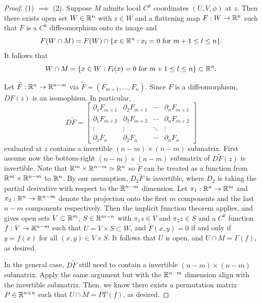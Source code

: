 \documentclass[a4paper]{article}
\begin{document}
\begin{proof}
(1) $\implies$ (2). Suppose $M$ admits local 
$C^k$ coordinates $(U, V, \phi)$ at $z$. Then there exists 
open set $W \in \mathbb{R}^n$ with $z \in W$ and a flattening map 
$F : W \to \mathbb{R}^n$ such that $F$ is a $C^k$ diffeomorphism 
onto its image and 
\[
F(W \cap M) = F(W) \cap \{x \in \mathbb{R}^n : \text{$x_l = 0$ 
for $m + 1 \leq l \leq n$}\}.
\]
It follows that 
\[
W \cap M = \{x \in W: \text{$F_l(x) = 0$ for 
$m + 1 \leq l \leq n$}\} \subset \mathbb{R}^n.
\]

Let $\widetilde{F} : \mathbb{R}^n \to \mathbb{R}^{n - m}$ 
via $\tilde{F} = (F_{m+1}, \dots, F_n)$.
Since $F$ is a diffeomorphism, $DF(z)$ is an isomophism. 
In particular,
\[
D \tilde{F} = 
\begin{bmatrix}
  \partial_1 F_{m+1} & \partial_2 F_{m+1} & \cdots & \partial_n F_{m+1} \\
  \partial_1 F_{m+2} & \partial_2 F_{m+2} & \cdots & \partial_n F_{m+2} \\
  \vdots & \vdots & \ddots & \vdots \\
  \partial_1 F_n & \partial_2 F_n & \cdots & \partial_n F_n
\end{bmatrix}
\]
evaluated at $z$ 
contains a invertible $(n - m) \times (n - m)$ submatrix.
First assume now the bottom-right $(n - m) \times (n - m)$ 
submatrix of $D \tilde{F} (z)$ is invertible. 
Note that $\mathbb{R}^m \times \mathbb{R}^{n - m} \simeq \mathbb{R}^n$ so $\tilde{F}$
can be treated as a function from $\mathbb{R}^m \times \mathbb{R}^{n - m}$
to $\mathbb{R}^n$. 
By our assumption, $D_2 \tilde{F}$ is invertible, where 
$D_2$ is taking the partial derivative with respect to the 
$\mathbb{R}^{n - m}$ dimension. Let $\pi_1 : \mathbb{R}^n \to \mathbb{R}^m$ and 
$\pi_2 : \mathbb{R}^n \to \mathbb{R}^{n-m}$ denote the 
projection onto the first $m$ components and the last 
$n - m$ components respectively. 
Then the implicit function theorem 
applies, and gives open sets $V \subset \mathbb{R}^m$, $S \in \mathbb{R}^{m - n}$ 
with $\pi_1 z \in V$ and 
$\pi_2 z \in S$ and a $C^k$ function $f : V \to \mathbb{R}^{n - m}$ 
such that $U = V \times S \subset W$, 
and $\tilde{F}(x, y) = 0$ if and only if 
$y = f(x)$ for all $(x, y) \in V \times S$. 
It follows that $U$ is open, and $U \cap M = \Gamma(f)$,
as desired. 

In the general case, $D \tilde{F}$ still need to contain 
a invertible $(n - m) \times (n - m)$ submatrix. Apply 
the same argument but with the $\mathbb{R}^{n - m}$ dimension align
with the invertible submatrix. Then, we know there exists 
a permutation matrix $P \in \mathbb{R}^{n \times n}$ such that 
$U \cap M = P \Gamma(f)$, as desired.


\end{proof}
\end{document}

